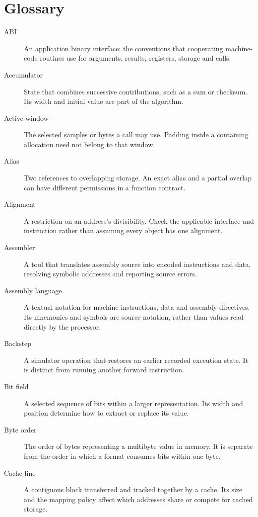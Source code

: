 \chapter*{Glossary}
\label{revision:glossary}

\begin{description}
  \item[ABI] An application binary interface: the conventions that cooperating
        machine-code routines use for arguments, results, registers, storage and calls.
  \item[Accumulator] State that combines successive contributions, such as a sum
        or checksum. Its width and initial value are part of the algorithm.
  \item[Active window] The selected samples or bytes a call may use. Padding inside
        a containing allocation need not belong to that window.
  \item[Alias] Two references to overlapping storage. An exact alias and a partial
        overlap can have different permissions in a function contract.
  \item[Alignment] A restriction on an address's divisibility. Check the applicable
        interface and instruction rather than assuming every object has one alignment.
  \item[Assembler] A tool that translates assembly source into encoded instructions and data, resolving symbolic addresses and reporting source errors.
  \item[Assembly language] A textual notation for machine instructions, data and assembly directives. Its mnemonics and symbols are source notation, rather than values read directly by the processor.
  \item[Backstep] A simulator operation that restores an earlier recorded execution
        state. It is distinct from running another forward instruction.
  \item[Bit field] A selected sequence of bits within a larger representation.
        Its width and position determine how to extract or replace its value.
  \item[Byte order] The order of bytes representing a multibyte value in memory.
        It is separate from the order in which a format consumes bits within one byte.
  \item[Cache line] A contiguous block transferred and tracked together by a cache. Its size and the mapping policy affect which addresses share or compete for cached storage.

\end{description}
